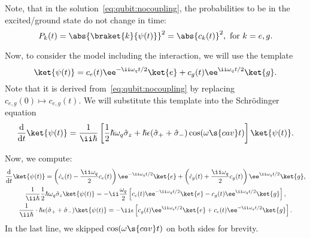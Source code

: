 \documentclass[fontsize=9pt,bookmarkpackage=false]{scrartcl}
\renewcommand{\hbar}{\hslash}
\begin{document}
Note, that in the solution~\eqref{eq:qubit:nocoupling}, the probabilities to be in the excited/ground state do not change in time:
\begin{equation}
  P_k (t) = \abs{ \braket{ k }{ \psi (t) } }^2 = \abs{ c_k (t) }^2,
  \text{ for } k = e,g.
\end{equation}

Now, to consider the model including the interaction, we will use the template
\begin{equation}
  \ket{ \psi (t) }
  =
  c_e (t) \ee^{ - \ii \omega_q t / 2 } \ket{ e }
  +
  c_g (t) \ee^{ \ii \omega_q t / 2 } \ket{ g }.
\end{equation}
Note that it is derived from~\cref{eq:qubit:nocoupling} by replacing $c_{e,g } (0) \mapsto c_{e,g } (t)$.
We will substitute this template into the Schrödinger equation
\begin{equation}
  \diff{}{ t} \ket{ \psi(t) }
  = \frac{ 1 }{ \ii \hbar }
  \left[
    \frac 12 \hbar \omega_q \hat \sigma_z
    +
    \hbar \epsilon ( \hat \sigma_+ + \hat \sigma_- )
    \cos ( \omega\s{cav} t )
  \right]
  \ket{ \psi (t) }.
\end{equation}

Now, we compute:
\begin{gather}
  \label{eq:rabi:lhs}
  \diff{}{ t } \ket{ \psi (t) }
  =
  \left( \dot c_e (t) - \frac{ \ii \omega_q  }{ 2 } c_e (t) \right) \ee^{ - \ii \omega_ q t / 2 } \ket{ e }
  +
  \left( \dot c_g (t) + \frac{\ii \omega_q}{2} c_g (t)\right) \ee^{ \ii \omega_ q t / 2 } \ket{ g },
  \\
  \label{eq:rabi:own}
  \frac{ 1 }{ \ii \hbar } \frac 12 \hbar \omega_q \hat \sigma_z \ket{ \psi (t) }
  = - \ii \frac{ \omega_ q }{ 2 }
  \left[
    c_e (t) \ee^ { - \ii \omega_q t / 2 }  \ket{ e }
    - c_g (t ) \ee^ { \ii \omega_q t / 2 } \ket { g }
  \right],
  \\
  \frac{ 1 }{ \ii \hbar } \cdot \hbar \epsilon ( \hat \sigma_+ + \hat \sigma_- )
  \ket{ \psi (t) }
  =
  - \ii \epsilon
  \left[
  c_g (t) \ee^{ \ii \omega_q t / 2 } \ket{ e }
  +
  c_e (t) \ee^{ - \ii \omega_q t / 2 } \ket{ g }
  \right].
\end{gather}
In the last line, we skipped $\cos( \omega\s{cav} t )$ on both sides for brevity.
\end{document}
